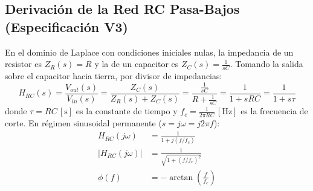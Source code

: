 \documentclass[11pt, a4paper]{article}
\begin{document}
\subsection{Derivación de la Red RC Pasa-Bajos (Especificación V3)}
En el dominio de Laplace con condiciones iniciales nulas, la impedancia de un resistor es $Z_R(s) = R$ y la de un capacitor es $Z_C(s) = \frac{1}{sC}$. Tomando la salida sobre el capacitor hacia tierra, por divisor de impedancias:
\begin{equation}
    H_{RC}(s) = \frac{V_{out}(s)}{V_{in}(s)} = \frac{Z_C(s)}{Z_R(s) + Z_C(s)} = \frac{\frac{1}{sC}}{R + \frac{1}{sC}} = \frac{1}{1 + sRC} = \frac{1}{1 + s\tau}
\end{equation}
donde $\tau = RC\,[\text{s}]$ es la constante de tiempo y $f_c = \frac{1}{2\pi RC}\,[\text{Hz}]$ es la frecuencia de corte. En régimen sinusoidal permanente ($s = j\omega = j2\pi f$):
\begin{align}
    H_{RC}(j\omega) &= \frac{1}{1 + j(f/f_c)} \\ 
    |H_{RC}(j\omega)| &= \frac{1}{\sqrt{1 + (f/f_c)^2}} \\
    \phi(f) &= -\arctan\left(\frac{f}{f_c}\right)
\end{align}
\end{document}
